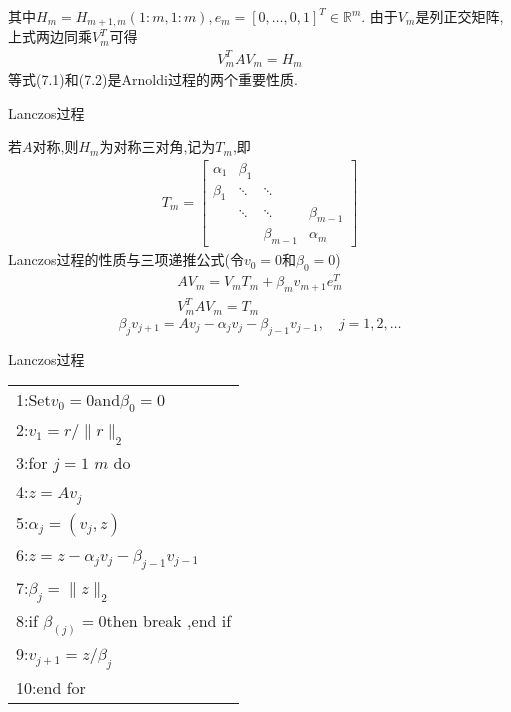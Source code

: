 \documentclass[notheorems,serif]{beamer}
\renewcommand{\normalsize}{\wuhao}
\newcommand{\wuhao}{\fontsize{10.5pt}{\baselineskip}\selectfont}
\begin{document}
\begin{frame}
其中$H_{m}=H_{m+1, m}(1 : m, 1 : m), e_{m}=[0, \ldots, 0,1]^{T} \in \mathbb{R}^{m}$.
由于$V_{m}$是列正交矩阵,上式两边同乘$V_{m}^{T}$可得
\begin{align*}
	V_{m}^{T} A V_{m}=H_{m}
	\tag{7.2}
\end{align*}
等式(7.1)和(7.2)是Arnoldi过程的两个重要性质.\\
\end{frame}

\begin{frame}


{\color{blue}\Large Lanczos过程}

\quad

\normalsize
若$A$对称,则$H_m$为对称三对角,记为$T_m$,即
\begin{align*}
	T_{m}=
	\left[\begin{array}{cccc}
		{\alpha_{1}} & {\beta_{1}} & {} & {} \\ 
		{\beta_{1}} & {\ddots} & {\ddots} & {} \\ 
		{} & {\ddots} & {\ddots} & {\beta_{m-1}} \\ 
		{} & {} & {\beta_{m-1}} & {\alpha_{m}}
	\end{array}\right]
	\tag{7.3}
\end{align*}
Lanczos过程的性质与{\color{blue}三项递推公式}(令$v_{0}=0$和$\beta_{0}=0$)
\begin{align*}
	{A V_{m}=V_{m} T_{m}+\beta_{m} v_{m+1} e_{m}^{T}}\tag{7.4}\\ 
	{V_{m}^{T} A V_{m}=T_{m}}\tag{7.5}
\end{align*}
$$
\beta_{j} v_{j+1}=A v_{j}-\alpha_{j} v_{j}-\beta_{j-1} v_{j-1}, \quad j=1,2, \ldots
$$
\end{frame}

\begin{frame}


{\color{blue}Lanczos过程}

\quad

\begin{tabular}{l}
    \hline
	1:Set$v_0=0$and$\beta_{0}=0$\\
	2:$v_{1}=r /\|r\|_{2}$\\
	3:for $j=1$ \text { to } $m$ do\\
	4:\qquad $z=A v_{j}$\\
	5:\qquad $\alpha_{j}=\left(v_{j}, z\right)$\\
	6:\qquad $z=z-\alpha_{j} v_{j}-\beta_{j-1} v_{j-1}$\\
	7:\qquad $\beta_{j}=\|z\|_{2}$\\
	8:\qquad if $\beta_(j)=0$then break ,end if\\
	9:\qquad $v_{j+1}=z / \beta_j$\\
	10:end for\\
	\hline
\end{tabular}
\end{frame}
\end{document}
